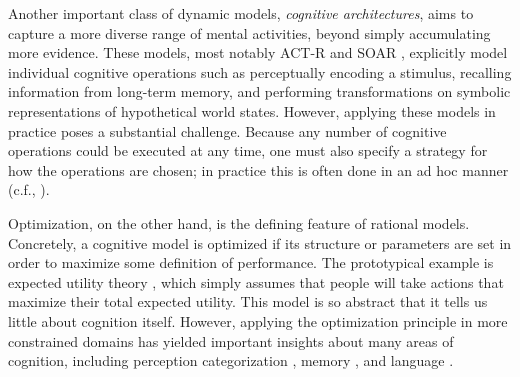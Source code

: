 

Another important class of dynamic models, \emph{cognitive architectures}, aims to capture a more diverse range of mental activities, beyond simply accumulating more evidence. These models, most notably ACT-R \citep{anderson1996act} and SOAR \citep{laird1987soar}, explicitly model individual cognitive operations such as perceptually encoding a stimulus, recalling information from long-term memory, and performing transformations on symbolic representations of hypothetical world states. 
However, applying these models in practice poses a substantial challenge. Because any number of cognitive operations could be executed at any time, one must also specify a strategy for how the operations are chosen; in practice this is often done in an ad hoc manner (c.f., \citealp{howes2009rational}).

Optimization, on the other hand, is the defining feature of rational models. Concretely, a cognitive model is optimized if its structure or parameters are set in order to maximize some definition of performance. The prototypical example is expected utility theory \citep{vonneumann1944theory,savage1954foundations}, which simply assumes that people will take actions that maximize their total expected utility. This model is so abstract that it tells us little about cognition itself. However, applying the optimization principle in more constrained domains has yielded important insights about many areas of cognition, including perception \citep{marr1982vision,knill1996perception,najemnik2005optimal} categorization \citep{anderson1991adaptive,ashby1995categorization}, memory \citep{anderson1989human}, and language \citep{goldwater2009bayesian}.


